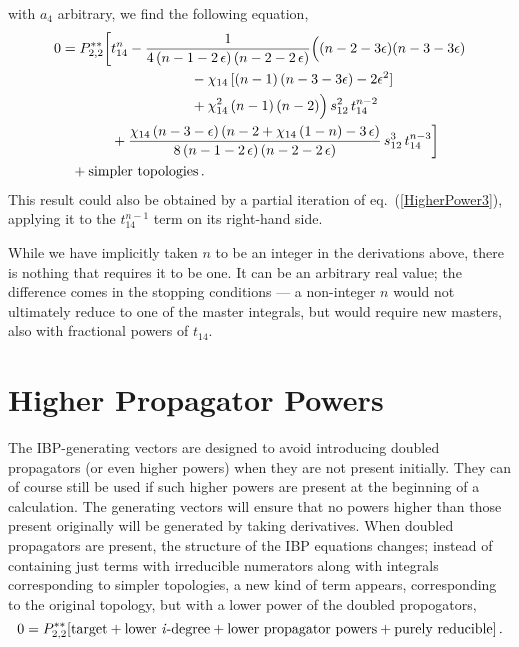 \documentclass[aps,prd,preprint,groupedaddress,nofootinbib,showpacs,eqsecnum]{revtex4}
\def\eqn#1{eq.~(\ref{#1})}
\def\eps{\epsilon}
\def\Pss#1#2{P^{**}_{#1,#2}}
\begin{document}
with $a_4$ arbitrary,
we find the following equation,
\begin{equation}
\begin{aligned}
0 = \Pss22\biggl[
&t_{14}^{n}
-\frac{1}{4\,(n-1-2\,\eps)\,(n-2-2\,\eps)}
\Bigl((n-2-3\eps)(n-3-3\eps)
\\&\hspace*{20mm}
-\chi_{14}\,[(n-1)\,(n-3-3\eps)-2\eps^2]
\\&\hspace*{20mm}
+\chi_{14}^{2}\,(n-1)\,(n-2)\Bigr)
\,s_{12}^{2}\,t_{14}^{n-2}
\\ &
+\frac{\chi_{14}\,(n-3-\eps)\,(n-2+\chi_{14}\,(1-n)-3\,\eps)}
{8\,(n-1-2\,\eps)\,(n-2-2\,\eps)}\,s_{12}^{3}\,t_{14}^{n-3}
\biggr]
\\ &\hspace*{-10mm} +\textrm{simpler\ topologies}\,.
\end{aligned}
\label{ReduceBy2}
\end{equation}
This result could also be obtained by a partial iteration of
\eqn{HigherPower3}, applying it to the $t_{14}^{n-1}$ term on
its right-hand side.

While we have implicitly taken $n$ to be an integer in the derivations
above, there is nothing that requires it to be one.  It can be an arbitrary
real value; the difference comes in the stopping conditions --- a
non-integer $n$ would not ultimately reduce to one of the master
integrals, but would require new masters, also with fractional powers
of $t_{14}$.

\section{Higher Propagator Powers}
\label{HigherPropagatorPowersSection}

The IBP-generating vectors are designed to avoid introducing doubled
propagators (or even higher powers) when they are not present initially.  They
can of course still be used if such higher powers are present at 
the beginning of a calculation.  The
generating vectors will ensure that no powers higher than those present
originally will be generated by taking derivatives.
When doubled propagators are present, the structure of the IBP equations 
changes; instead of
containing just terms with irreducible numerators
along with integrals corresponding to simpler topologies, a new kind
of term appears, corresponding to the original topology, but with a lower
power of the doubled propogators,
\begin{equation}
0 = \Pss22[\textrm{target} + \textrm{lower\ \ideg{}}
+ \textrm{lower\ propagator\ powers}
+\textrm{purely\ reducible}]\,.
\end{equation}
\end{document}
